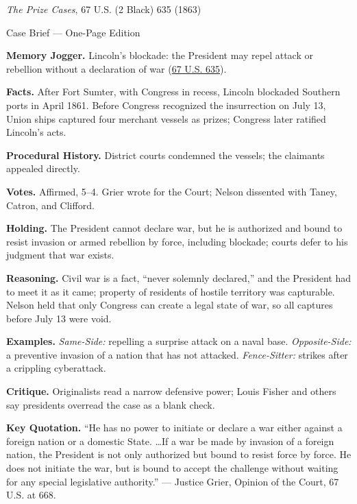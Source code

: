 \documentclass[12pt]{article}
\begin{document}
\begin{center}
{\Large \textit{The Prize Cases}, 67 U.S. (2 Black) 635 (1863)\par}
\vspace{0.3em}
{\normalsize Case Brief --- One-Page Edition\par}
\end{center}

\textbf{Memory Jogger.} Lincoln's blockade: the President may repel attack or rebellion without a declaration of war (\href{https://supreme.justia.com/cases/federal/us/67/635/}{67 U.S. 635}).

\textbf{Facts.} After Fort Sumter, with Congress in recess, Lincoln blockaded Southern ports in April 1861. Before Congress recognized the insurrection on July 13, Union ships captured four merchant vessels as prizes; Congress later ratified Lincoln's acts.

\textbf{Procedural History.} District courts condemned the vessels; the claimants appealed directly.

\textbf{Votes.} Affirmed, 5--4. Grier wrote for the Court; Nelson dissented with Taney, Catron, and Clifford.

\textbf{Holding.} The President cannot declare war, but he is authorized and bound to resist invasion or armed rebellion by force, including blockade; courts defer to his judgment that war exists.

\textbf{Reasoning.} Civil war is a fact, ``never solemnly declared,'' and the President had to meet it as it came; property of residents of hostile territory was capturable. Nelson held that only Congress can create a legal state of war, so all captures before July 13 were void.

\textbf{Examples.} \emph{Same-Side:} repelling a surprise attack on a naval base. \emph{Opposite-Side:} a preventive invasion of a nation that has not attacked. \emph{Fence-Sitter:} strikes after a crippling cyberattack.

\textbf{Critique.} Originalists read a narrow defensive power; Louis Fisher and others say presidents overread the case as a blank check.

\textbf{Key Quotation.} ``He has no power to initiate or declare a war either against a foreign nation or a domestic State. \ldots If a war be made by invasion of a foreign nation, the President is not only authorized but bound to resist force by force. He does not initiate the war, but is bound to accept the challenge without waiting for any special legislative authority.'' --- Justice Grier, Opinion of the Court, 67 U.S. at 668.
\end{document}
